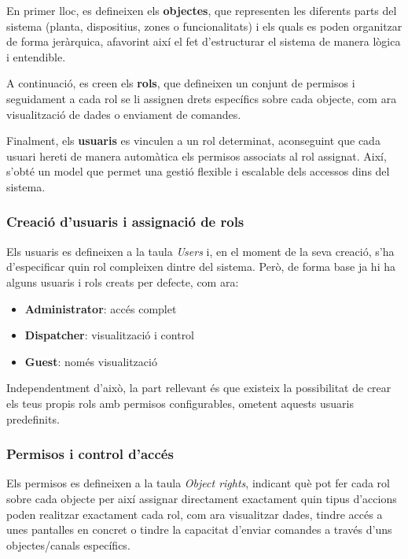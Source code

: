\documentclass[a4paper,11pt,DIV=13,headings=normal,abstract=true,twoside=semi]{article}
\begin{document}
En primer lloc, es defineixen els \textbf{objectes}, que representen les diferents parts del sistema (planta, dispositius, zones o funcionalitats) i els quals es poden organitzar de forma jeràrquica, afavorint així el fet d'estructurar el sistema de manera lògica i entendible.

A continuació, es creen els \textbf{rols}, que defineixen un conjunt de permisos i seguidament a cada rol se li assignen drets específics sobre cada objecte, com ara visualització de dades o enviament de comandes.

Finalment, els \textbf{usuaris} es vinculen a un rol determinat, aconseguint que cada usuari hereti de manera automàtica els permisos associats al rol assignat. Així, s'obté un model que permet una gestió flexible i escalable dels accessos dins del sistema.

\subsubsection*{Creació d'usuaris i assignació de rols}

Els usuaris es defineixen a la taula \emph{Users} i, en el moment de la seva creació, s'ha d'especificar quin rol compleixen dintre del sistema. Però, de forma base ja hi ha alguns usuaris i rols creats per defecte, com ara:
\begin{itemize}
    \item \textbf{Administrator}: accés complet
    \item \textbf{Dispatcher}: visualització i control
    \item \textbf{Guest}: només visualització
\end{itemize}

Independentment d'això, la part rellevant és que existeix la possibilitat de crear els teus propis rols amb permisos configurables, ometent aquests usuaris predefinits.

\subsubsection*{Permisos i control d'accés}

Els permisos es defineixen a la taula \emph{Object rights}, indicant què pot fer cada rol sobre cada objecte per així assignar directament exactament quin tipus d'accions poden realitzar exactament cada rol, com ara visualitzar dades, tindre accés a unes pantalles en concret o tindre la capacitat d'enviar comandes a través d'uns objectes/canals específics. 
\end{document}
